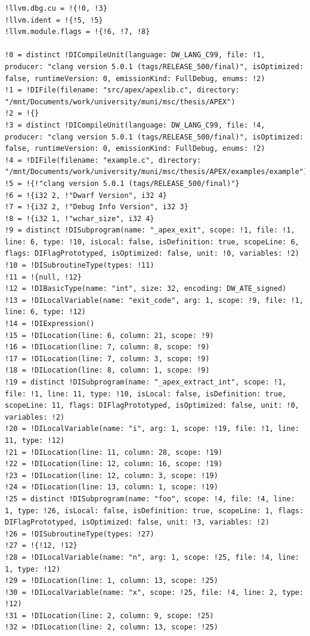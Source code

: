 \documentclass[12pt, twoside]{fithesis2}
\renewcommand{\_}{\leavevmode \kern0.07em\vbox{\hrule width0.4em}}
\begin{document}
\begin{verbatim}
!llvm.dbg.cu = !{!0, !3}
!llvm.ident = !{!5, !5}
!llvm.module.flags = !{!6, !7, !8}

!0 = distinct !DICompileUnit(language: DW_LANG_C99, file: !1, producer: "clang version 5.0.1 (tags/RELEASE_500/final)", isOptimized: false, runtimeVersion: 0, emissionKind: FullDebug, enums: !2)
!1 = !DIFile(filename: "src/apex/apexlib.c", directory: "/mnt/Documents/work/university/muni/msc/thesis/APEX")
!2 = !{}
!3 = distinct !DICompileUnit(language: DW_LANG_C99, file: !4, producer: "clang version 5.0.1 (tags/RELEASE_500/final)", isOptimized: false, runtimeVersion: 0, emissionKind: FullDebug, enums: !2)
!4 = !DIFile(filename: "example.c", directory: "/mnt/Documents/work/university/muni/msc/thesis/APEX/examples/example")
!5 = !{!"clang version 5.0.1 (tags/RELEASE_500/final)"}
!6 = !{i32 2, !"Dwarf Version", i32 4}
!7 = !{i32 2, !"Debug Info Version", i32 3}
!8 = !{i32 1, !"wchar_size", i32 4}
!9 = distinct !DISubprogram(name: "_apex_exit", scope: !1, file: !1, line: 6, type: !10, isLocal: false, isDefinition: true, scopeLine: 6, flags: DIFlagPrototyped, isOptimized: false, unit: !0, variables: !2)
!10 = !DISubroutineType(types: !11)
!11 = !{null, !12}
!12 = !DIBasicType(name: "int", size: 32, encoding: DW_ATE_signed)
!13 = !DILocalVariable(name: "exit_code", arg: 1, scope: !9, file: !1, line: 6, type: !12)
!14 = !DIExpression()
!15 = !DILocation(line: 6, column: 21, scope: !9)
!16 = !DILocation(line: 7, column: 8, scope: !9)
!17 = !DILocation(line: 7, column: 3, scope: !9)
!18 = !DILocation(line: 8, column: 1, scope: !9)
!19 = distinct !DISubprogram(name: "_apex_extract_int", scope: !1, file: !1, line: 11, type: !10, isLocal: false, isDefinition: true, scopeLine: 11, flags: DIFlagPrototyped, isOptimized: false, unit: !0, variables: !2)
!20 = !DILocalVariable(name: "i", arg: 1, scope: !19, file: !1, line: 11, type: !12)
!21 = !DILocation(line: 11, column: 28, scope: !19)
!22 = !DILocation(line: 12, column: 16, scope: !19)
!23 = !DILocation(line: 12, column: 3, scope: !19)
!24 = !DILocation(line: 13, column: 1, scope: !19)
!25 = distinct !DISubprogram(name: "foo", scope: !4, file: !4, line: 1, type: !26, isLocal: false, isDefinition: true, scopeLine: 1, flags: DIFlagPrototyped, isOptimized: false, unit: !3, variables: !2)
!26 = !DISubroutineType(types: !27)
!27 = !{!12, !12}
!28 = !DILocalVariable(name: "n", arg: 1, scope: !25, file: !4, line: 1, type: !12)
!29 = !DILocation(line: 1, column: 13, scope: !25)
!30 = !DILocalVariable(name: "x", scope: !25, file: !4, line: 2, type: !12)
!31 = !DILocation(line: 2, column: 9, scope: !25)
!32 = !DILocation(line: 2, column: 13, scope: !25)

\end{verbatim}
\end{document}
